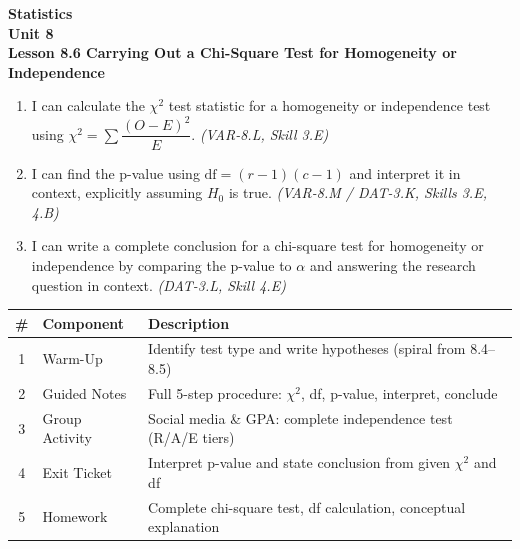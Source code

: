 \documentclass[10pt]{article}
\begin{document}
\vspace{-0.8in}

\begin{center}
  {\color{white}\textbf{\LARGE Statistics}}\\[4pt]
  {\color{skymid}\large\textbf{Unit 8}}\\[6pt]
  {\color{white}\textbf{\large Lesson 8.6 \quad Carrying Out a Chi-Square Test for Homogeneity or Independence}}
\end{center}

\vspace{0.22in}
\namedateperiod
\vspace{0.18in}

\begin{learningtargetbox}
\small
\begin{enumerate}[leftmargin=1.5em, itemsep=5pt]
  \item I can calculate the $\chi^2$ test statistic for a homogeneity or independence
        test using $\chi^2 = \displaystyle\sum \dfrac{(O-E)^2}{E}$.
        \textit{(VAR-8.L, Skill 3.E)}
  \item I can find the p-value using $\text{df} = (r-1)(c-1)$ and interpret it in
        context, explicitly assuming $H_0$ is true.
        \textit{(VAR-8.M / DAT-3.K, Skills 3.E, 4.B)}
  \item I can write a complete conclusion for a chi-square test for homogeneity or
        independence by comparing the p-value to $\alpha$ and answering the research
        question in context.
        \textit{(DAT-3.L, Skill 4.E)}
\end{enumerate}
\end{learningtargetbox}

\vspace{0.14in}

\begin{tocbox}
\small
\renewcommand{\arraystretch}{1.5}
\begin{tabularx}{\linewidth}{@{} c l X @{}}
\rowcolor{sky}
\textbf{\#} & \textbf{Component} & \textbf{Description} \\
\midrule
1 & Warm-Up        & Identify test type and write hypotheses (spiral from 8.4--8.5) \\
2 & Guided Notes   & Full 5-step procedure: $\chi^2$, df, p-value, interpret, conclude \\
3 & Group Activity & Social media \& GPA: complete independence test (R/A/E tiers) \\
4 & Exit Ticket    & Interpret p-value and state conclusion from given $\chi^2$ and df \\
5 & Homework       & Complete chi-square test, df calculation, conceptual explanation \\
\end{tabularx}
\end{tocbox}
\end{document}
